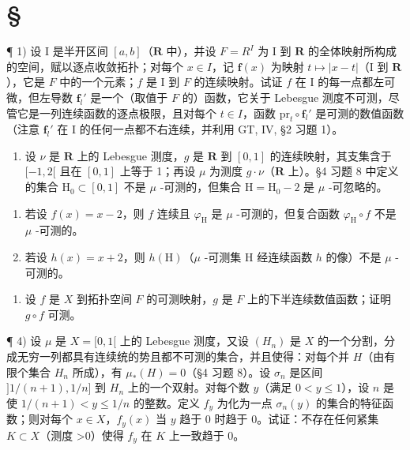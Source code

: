 \section*{\texorpdfstring{\S\CurrentExerciseGroup}{第{\CurrentExerciseGroup}节}}
{}

¶ 1) 设 I 是半开区间 \([a, b]\)（\(\mathbf{R}\) 中），并设 \(F = R^I\) 为 I 到 \(\mathbf{R}\) 的全体映射所构成的空间，赋以逐点收敛拓扑；对每个 \(x \in I\)，记 \(\mathbf{f}(x)\) 为映射 \(t \mapsto |x - t|\)（I 到 \(\mathbf{R}\)），它是 \(F\) 中的一个元素；\(f\) 是 I 到 \(F\) 的连续映射。试证 \(f\) 在 I 的每一点都左可微，但左导数 \(\mathbf{f}_l'\) 是一个（取值于 \(F\) 的）函数，它关于 Lebesgue 测度不可测，尽管它是一列连续函数的逐点极限，且对每个 \(t \in I\)，函数 \(\text{pr}_t \circ \mathbf{f}_l'\) 是可测的数值函数（注意 \(\mathbf{f}_l'\) 在 I 的任何一点都不右连续，并利用 GT, IV, §2 习题 1）。

\begin{enumerate}
\def\labelenumi{\arabic{enumi})}
\setcounter{enumi}{1}
\tightlist
\item
  设 \(\nu\) 是 \(\mathbf{R}\) 上的 Lebesgue 测度，\(g\) 是 \(\mathbf{R}\) 到 \([0,1]\) 的连续映射，其支集含于 \([-1,2[\) 且在 \([0,1]\) 上等于 1；再设 \(\mu\) 为测度 \(g \cdot \nu\)（\(\mathbf{R}\) 上）。§4 习题 8 中定义的集合 \(\mathrm{H}_0 \subset [0,1]\) 不是 \(\mu\) -可测的，但集合 \(\mathrm{H} = \mathrm{H}_0 - 2\) 是 \(\mu\) -可忽略的。
\end{enumerate}

\begin{enumerate}
\def\labelenumi{\alph{enumi})}
\item
  若设 \(f(x) = x - 2\)，则 \(f\) 连续且 \(\varphi_{\mathrm{H}}\) 是 \(\mu\) -可测的，但复合函数 \(\varphi_{\mathrm{H}} \circ f\) 不是 \(\mu\) -可测的。
\item
  若设 \(h(x) = x + 2\)，则 \(h(\mathrm{H})\)（\(\mu\) -可测集 \(\mathrm{H}\) 经连续函数 \(h\) 的像）不是 \(\mu\) -可测的。
\end{enumerate}

\begin{enumerate}
\def\labelenumi{\arabic{enumi})}
\setcounter{enumi}{2}
\tightlist
\item
  设 \(f\) 是 \(X\) 到拓扑空间 \(F\) 的可测映射，\(g\) 是 \(F\) 上的下半连续数值函数；证明 \(g \circ f\) 可测。
\end{enumerate}

¶ 4) 设 \(\mu\) 是 \(X = [0,1[\) 上的 Lebesgue 测度，又设 \((H_n)\) 是 \(X\) 的一个分割，分成无穷一列都具有连续统的势且都不可测的集合，并且使得：对每个并 \(H\)（由有限个集合 \(H_n\) 所成），有 \(\mu_*(H) = 0\)（§4 习题 8）。设 \(\sigma_n\) 是区间 \(]1/(n+1),1/n]\) 到 \(H_n\) 上的一个双射。对每个数 \(y\)（满足 \(0 < y \leqslant 1\)），设 \(n\) 是使 \(1/(n+1) < y \leqslant 1/n\) 的整数。定义 \(f_y\) 为化为一点 \(\sigma_n(y)\) 的集合的特征函数；则对每个 \(x \in X\)，\(f_y(x)\) 当 \(y\) 趋于 0 时趋于 0。试证：不存在任何紧集 \(K \subset X\)（测度 \textgreater0）使得 \(f_y\) 在 \(K\) 上一致趋于 0。

